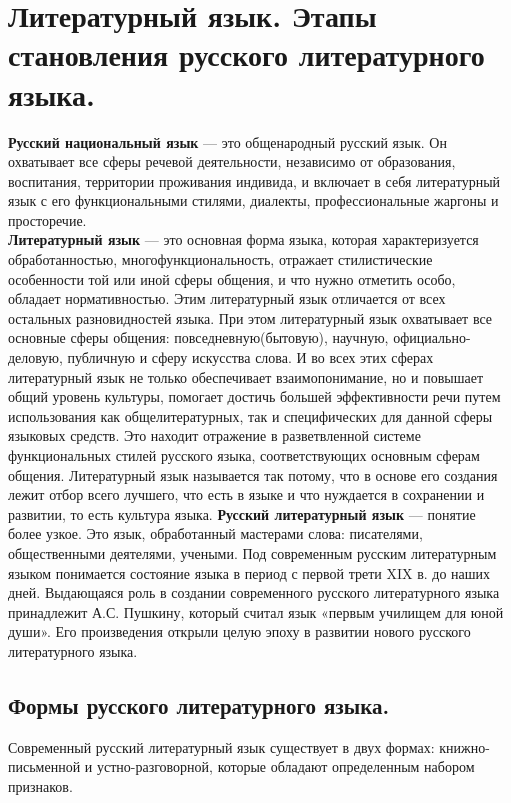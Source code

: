 \section{Литературный язык. Этапы становления русского литературного языка.}
 

\textbf{Русский национальный язык} --- это общенародный русский язык.
Он охватывает все сферы речевой деятельности, независимо от образования, воспитания, территории проживания индивида, и включает в себя литературный язык с его функциональными стилями, диалекты, профессиональные жаргоны и просторечие.
\textbf{\\ Литературный язык } — это основная форма языка, которая характеризуется обработанностью, многофункциональность, отражает стилистические особенности той или иной сферы общения, и что нужно отметить особо,
обладает нормативностью. Этим литературный язык отличается от всех остальных разновидностей языка. При этом литературный язык охватывает все основные сферы общения: повседневную(бытовую), научную, официально-деловую, публичную
и сферу искусства слова. И во всех этих сферах литературный язык не только обеспечивает взаимопонимание, но и повышает
общий уровень культуры, помогает достичь большей эффективности речи путем использования как общелитературных, так и
специфических для данной сферы языковых средств. Это находит отражение в разветвленной системе функциональных стилей
русского языка, соответствующих основным сферам общения. Литературный язык называется так потому, что в основе его
создания лежит отбор всего лучшего, что есть в языке и что нуждается в сохранении и развитии, то есть культура языка.
\textbf{Русский литературный язык} --- понятие более узкое. Это язык, обработанный мастерами слова: писателями, общественными
деятелями, учеными.
Под современным русским литературным языком понимается состояние языка в период с первой трети XIX в. до наших дней.
Выдающаяся роль в создании современного русского литературного языка принадлежит А.С. Пушкину, который считал язык «первым училищем для юной души».
Его произведения открыли целую эпоху в развитии нового русского литературного языка.

\subsection*{Формы русского литературного языка.}

Современный русский литературный язык существует в двух формах: книжно-письменной и устно-разговорной, которые обладают определенным набором признаков.

